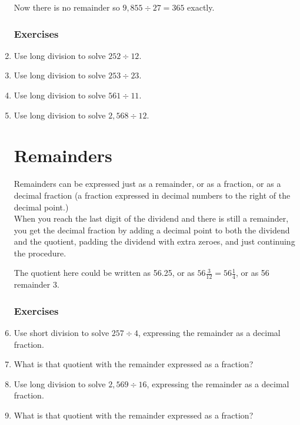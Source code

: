 \documentclass{article}
\begin{document}
\begin{enumerate}
Now there is no remainder so $9,855 \div 27 = 365$ exactly.

\subsubsection{Exercises}

\item Use long division to solve $252 \div 12$.
\item Use long division to solve $253 \div 23$.
\item Use long division to solve $561 \div 11$.
\item Use long division to solve $2,568 \div 12$.

\pagebreak

\section{Remainders}
Remainders can be expressed just as a remainder, or as a fraction, or as a decimal fraction (a fraction expressed in decimal numbers to the right of the decimal point.)\\

When you reach the last digit of the dividend and there is still a remainder, you get the decimal fraction by adding a decimal point to both the dividend and the quotient, padding the dividend with extra zeroes, and just continuing the procedure.

\begin{center}
\end{center}

The quotient here could be written as 56.25, or as $56 \frac{3}{12}=56 \frac{1}{4}$, or as 56 remainder 3.

\newpage

\subsubsection{Exercises}

\item Use short division to solve $257 \div 4$, expressing the remainder as a decimal fraction.
\item What is that quotient with the remainder expressed as a fraction?
\item Use long division to solve $2,569 \div 16$, expressing the remainder as a decimal fraction.
\item What is that quotient with the remainder expressed as a fraction?


\end{enumerate}
\end{document}
